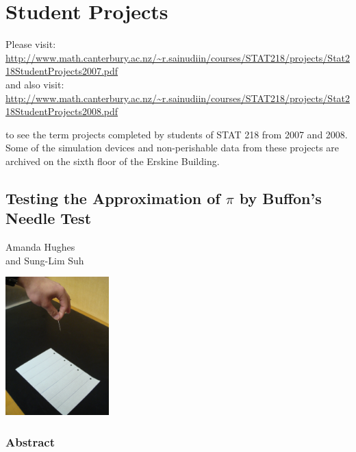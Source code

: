 \chapter{Student Projects}\label{S:StudentProjects2007}
Please visit: 
\href{http://www.math.canterbury.ac.nz/~r.sainudiin/courses/STAT218/projects/Stat218StudentProjects2007.pdf}{\url{http://www.math.canterbury.ac.nz/~r.sainudiin/courses/STAT218/projects/Stat218StudentProjects2007.pdf}}\\
and also visit: \href{http://www.math.canterbury.ac.nz/~r.sainudiin/courses/STAT218/projects/Stat218StudentProjects2008.pdf}{\url{http://www.math.canterbury.ac.nz/~r.sainudiin/courses/STAT218/projects/Stat218StudentProjects2008.pdf}} 

to see the term projects completed by students of STAT 218 from 2007 and 2008.  Some of the simulation devices and non-perishable data from these projects are archived on the sixth floor of the Erskine Building.

\newpage
\section{Testing the Approximation of $\pi$ by Buffon's Needle Test}
\begin{center}
Amanda Hughes \\and Sung-Lim Suh
\end{center}


\begin{center}
\includegraphics[width=4cm]{figures/BuffonNeedle_Drop}
\end{center}


\subsection*{Abstract}

